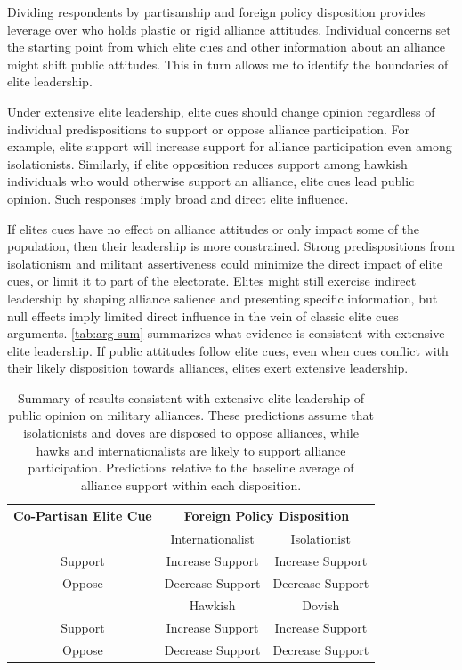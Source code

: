 \documentclass[12pt]{article}
\begin{document}
Dividing respondents by partisanship and foreign policy disposition provides leverage over who holds plastic or rigid alliance attitudes. 
Individual concerns set the starting point from which elite cues and other information about an alliance might shift public attitudes.
This in turn allows me to identify the boundaries of elite leadership. 


Under extensive elite leadership, elite cues should change opinion regardless of individual predispositions to support or oppose alliance participation. 
For example, elite support will increase support for alliance participation even among isolationists. 
Similarly, if elite opposition reduces support among hawkish individuals who would otherwise support an alliance, elite cues lead public opinion. 
Such responses imply broad and direct elite influence. 


If elites cues have no effect on alliance attitudes or only impact some of the population, then their leadership is more constrained.
Strong predispositions from isolationism and militant assertiveness could minimize the direct impact of elite cues, or limit it to part of the electorate.
Elites might still exercise indirect leadership by shaping alliance salience and presenting specific information, but null effects imply limited direct influence in the vein of classic elite cues arguments. 
\autoref{tab:arg-sum} summarizes what evidence is consistent with extensive elite leadership.  
If public attitudes follow elite cues, even when cues conflict with their likely disposition towards alliances, elites exert extensive leadership. 


\begin{table}[hbt!]
\begin{center}
\begin{tabular}{ccc}
Co-Partisan Elite Cue & \multicolumn{2}{c}{Foreign Policy Disposition}  \\
\hline 
           &          Internationalist & Isolationist  \\
\hline                  
 Support   & Increase Support  &  Increase Support \\
 Oppose    & Decrease Support  &  Decrease Support \\     
\hline                          
           &        Hawkish           & Dovish  \\
\hline
 Support   & Increase Support  &  Increase Support \\
 Oppose    & Decrease Support  &  Decrease Support \\
\hline
\end{tabular}
\caption{Summary of results consistent with extensive elite leadership of public opinion on military alliances. These predictions assume that isolationists and doves are disposed to oppose alliances, while hawks and internationalists are likely to support alliance participation. Predictions relative to the baseline average of alliance support within each disposition.}
\label{tab:arg-sum}
\end{center} 
\end{table}
\end{document}
